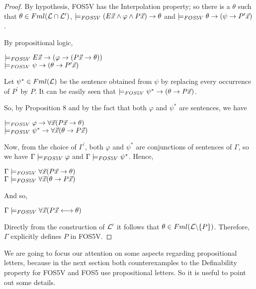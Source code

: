 \begin{proof}
\qquad By hypothesis, FOS5V has the Interpolation property; so there is a $\theta$ such that $\theta \in Fml(\mathcal{L}\cap\mathcal{L}^{\prime})$, $\models_{FOS5V} (E\vec{x} \wedge \varphi\wedge P\vec{x}) \rightarrow \theta$ and $\models_{FOS5V} \theta \rightarrow (\psi \rightarrow P^{\prime}\vec{x})$.

\pagebreak

\qquad By propositional logic,

\begin{center}
$\models_{FOS5V} E\vec{x} \rightarrow (\varphi\rightarrow (P\vec{x} \rightarrow \theta))$\\
$\models_{FOS5V} \psi \rightarrow (\theta \rightarrow P^{\prime}\vec{x})$
\end{center}

\qquad Let $\psi^{*} \in Fml(\mathcal{L})$ be the sentence obtained from $\psi$ by replacing every occurrence of $P^{\prime}$ by $P$. It can be easily seen that $\models_{FOS5V} \psi^{*} \rightarrow (\theta \rightarrow P\vec{x})$.

\qquad So, by Proposition 8 and by the fact that both $\varphi$ and $\psi^{*}$ are  sentences, we have 

\begin{center}
$\models_{FOS5V} \varphi\rightarrow \forall \vec{x} (P\vec{x} \rightarrow \theta)$ \\
$\models_{FOS5V} \psi^{*} \rightarrow \forall \vec{x} (\theta \rightarrow P\vec{x})$
\end{center}






\qquad Now, from the choice of $\Gamma^{\prime}$, both $\varphi$ and $\psi^{*}$ are conjunctions of sentences of $\Gamma$, so we have $\Gamma \models_{FOS5V} \varphi$ and $\Gamma \models_{FOS5V} \psi^{*}$. Hence, 

\begin{center}
$\Gamma \models_{FOS5V} \forall \vec{x} (P\vec{x} \rightarrow \theta)$\\
$\Gamma \models_{FOS5V} \forall \vec{x} (\theta \rightarrow P\vec{x})$
\end{center}




And so,

\begin{center}
$\Gamma \models_{FOS5V} \forall \vec{x} (P\vec{x} \longleftrightarrow \theta)$
\end{center} 

\qquad Directly from the construction of $\mathcal{L}^{\prime}$ it follows that $\theta\in Fml(\mathcal{L}\backslash\{P\})$. Therefore, $\Gamma$ explicitly defines $P$ in FOS5V.
\end{proof}


\qquad We are going to focus our attention on some aspects regarding propositional letters, because in the next section both counterexamples to the Definability property for FOS5V and FOS5 use propositional letters. So it is useful to point out some details.

